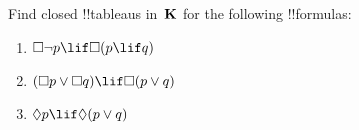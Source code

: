 \documentclass[../../../include/open-logic-section]{subfiles}
\begin{document}
\begin{prob}
  Find closed !!{tableau}s in~$\mathbf{K}$ for the following !!{formula}s:
  \begin{enumerate}
    \item $\Box \lnot p \lif \Box(p \lif q)$
    \item $(\Box p \lor \Box q) \lif \Box(p \lor q)$
    \item $\Diamond p \lif \Diamond(p \lor q)$
  \end{enumerate}
\end{prob}
\end{document}
